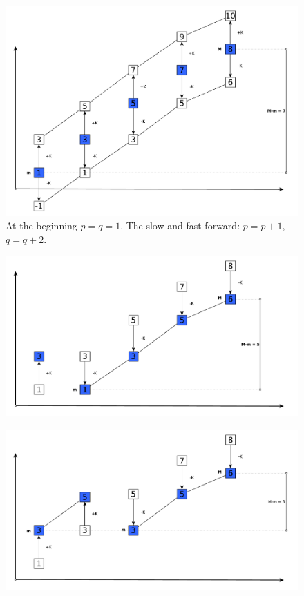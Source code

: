 \begin{figure}
	\centering
	
		\includegraphics[width=1\linewidth]{sources/smallest_range/images/bars}
		\caption{At the beginning $p=q=1$. The slow and fast forward: $p=p+1$, $q=q+2$.}
		\label{fig:smallest_range:bars_full}
\end{figure}	




\begin{figure}
	\centering
	
		\includegraphics[width=1\linewidth]{sources/smallest_range/images/bars2}
		\caption{}
		\label{fig:smallest_range:bars2}
\end{figure}	

\begin{figure}
	\centering
	
		\includegraphics[width=1\linewidth]{sources/smallest_range/images/bars3}
		\caption{}
		\label{fig:smallest_range:bars3}
\end{figure}	

